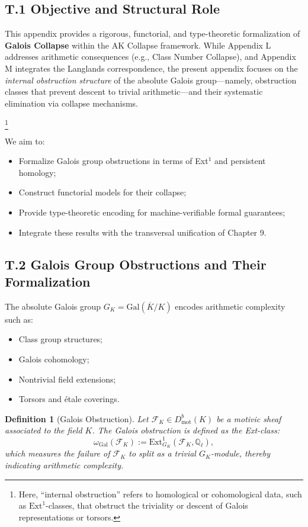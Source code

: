 \documentclass[11pt]{article}
\newtheorem{definition}[theorem]{Definition}
\begin{document}
\subsection*{T.1 Objective and Structural Role}

This appendix provides a rigorous, functorial, and type-theoretic formalization of \textbf{Galois Collapse} within the AK Collapse framework. While Appendix L addresses arithmetic consequences (e.g., Class Number Collapse), and Appendix M integrates the Langlands correspondence, the present appendix focuses on the \emph{internal obstruction structure} of the absolute Galois group—namely, obstruction classes that prevent descent to trivial arithmetic—and their systematic elimination via collapse mechanisms.

\footnote{Here, ``internal obstruction'' refers to homological or cohomological data, such as $\mathrm{Ext}^1$-classes, that obstruct the triviality or descent of Galois representations or torsors.}

We aim to:
\begin{itemize}
    \item Formalize Galois group obstructions in terms of Ext$^1$ and persistent homology;
    \item Construct functorial models for their collapse;
    \item Provide type-theoretic encoding for machine-verifiable formal guarantees;
    \item Integrate these results with the transversal unification of Chapter 9.
\end{itemize}

\subsection*{T.2 Galois Group Obstructions and Their Formalization}

The absolute Galois group $G_K = \mathrm{Gal}(\overline{K}/K)$ encodes arithmetic complexity such as:
\begin{itemize}
    \item Class group structures;
    \item Galois cohomology;
    \item Nontrivial field extensions;
    \item Torsors and étale coverings.
\end{itemize}

\begin{definition}[Galois Obstruction]
Let $\mathcal{F}_K \in D^b_{\mathrm{mot}}(K)$ be a motivic sheaf associated to the field $K$. The Galois obstruction is defined as the Ext-class:
\[
\omega_{\mathrm{Gal}}(\mathcal{F}_K) := \mathrm{Ext}^1_{G_K}(\mathcal{F}_K, \mathbb{Q}_\ell),
\]
which measures the failure of $\mathcal{F}_K$ to split as a trivial $G_K$-module, thereby indicating arithmetic complexity.
\end{definition}
\end{document}
